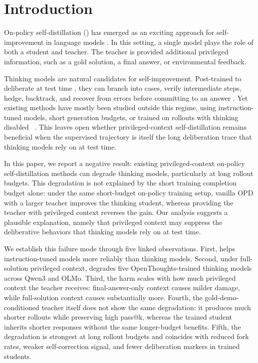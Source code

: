 \section{Introduction}
\label{sec:intro}

On-policy self-distillation (\opsd{}) has emerged as an exciting approach for self-improvement in language models \mbox{\citep{zhao2026selfdistilledreasoneronpolicyselfdistillation,shenfeld2026self,hubotter2026reinforcement}}.
In this setting, a single model plays the role of both a student and  teacher.
The teacher is provided additional privileged information, such as a gold solution, a final answer, or environmental feedback.

Thinking models are natural candidates for self-improvement. Post-trained to deliberate at test time \mbox{\citep{openai2024learning,deepseek2025r1,yang2025qwen3}},
they can branch into cases, verify intermediate steps, hedge, backtrack, and recover from errors before committing to an answer \mbox{\citep{arora2025training,gandhi2025cognitive,venhoff2025understanding}}.
Yet existing methods have mostly been studied outside this regime, using instruction-tuned models, short generation budgets, or trained on rollouts with thinking disabled  ~\citep{zhao2026selfdistilledreasoneronpolicyselfdistillation, shenfeld2026self, hubotter2026reinforcement}. This leaves open whether privileged-context self-distillation remains beneficial when the supervised trajectory is itself the long deliberation trace that thinking models rely on at test time.

In this paper, we report a negative result: existing privileged-context on-policy self-distillation methods can degrade thinking models, particularly at long rollout budgets. This degradation is not explained by the short training completion budget alone: under the same short-budget on-policy training setup, vanilla OPD with a larger teacher improves the thinking student, whereas providing the teacher with privileged context reverses the gain. Our analysis suggests a plausible explanation, namely that privileged context may suppress the deliberative behaviors that thinking models rely on at test time.

We establish this failure mode through five linked observations. First, \opsd{} helps instruction-tuned models more reliably than thinking models. Second, under full-solution privileged context, \opsd{} degrades five OpenThoughts-trained thinking models across Qwen3 and OLMo. Third, the harm scales with how much privileged context the teacher receives: final-answer-only context causes milder damage, while full-solution context causes substantially more. Fourth, the gold-demo-conditioned teacher itself does not show the same degradation: it produces much shorter rollouts while preserving high pass@k, whereas the trained student inherits shorter responses without the same longer-budget benefits. Fifth, the degradation is strongest at long rollout budgets and coincides with reduced fork rates, weaker self-correction signal, and fewer deliberation markers in trained students.

